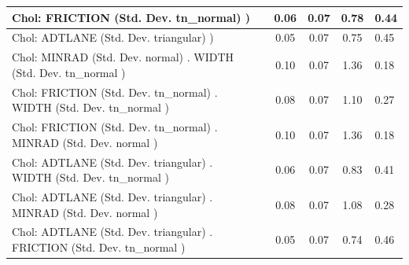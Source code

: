 \begin{table}
\begin{center}
\begin{tabular}{|l|l|c|c|c|l|}
			\hline
			 Chol: FRICTION (Std. Dev. tn_normal) ) &  & 0.06 & 0.07 & 0.78 & 0.44 \\
			\hline
			 Chol: ADTLANE (Std. Dev. triangular) ) &  & 0.05 & 0.07 & 0.75 & 0.45 \\
			\hline
			 Chol: MINRAD (Std. Dev. normal) . WIDTH (Std. Dev.   tn_normal ) &  & 0.10 & 0.07 & 1.36 & 0.18 \\
			\hline
			 Chol: FRICTION (Std. Dev. tn_normal) . WIDTH (Std. Dev.   tn_normal ) &  & 0.08 & 0.07 & 1.10 & 0.27 \\
			\hline
			 Chol: FRICTION (Std. Dev. tn_normal) . MINRAD (Std. Dev.   normal ) &  & 0.10 & 0.07 & 1.36 & 0.18 \\
			\hline
			 Chol: ADTLANE (Std. Dev. triangular) . WIDTH (Std. Dev.   tn_normal ) &  & 0.06 & 0.07 & 0.83 & 0.41 \\
			\hline
			 Chol: ADTLANE (Std. Dev. triangular) . MINRAD (Std. Dev.   normal ) &  & 0.08 & 0.07 & 1.08 & 0.28 \\
			\hline
			 Chol: ADTLANE (Std. Dev. triangular) . FRICTION (Std. Dev.   tn_normal ) &  & 0.05 & 0.07 & 0.74 & 0.46 \\
			\hline
		\end{tabular}
	\end{center}
\end{table}